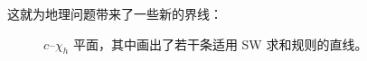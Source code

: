 这就为地理问题带来了一些新的界线：

\begin{figure}[H]
  \centering
  \caption{$c$--$\chi_{h}$ 平面，其中画出了若干条适用 SW 求和规则的直线。}
  \label{fig:c-chih-plane}
\end{figure}





